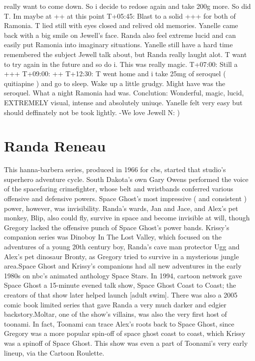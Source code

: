 \documentclass[12pt]{book}
\begin{document}
really want to come down. So i decide to redose again and take 200g more. So did T. Im maybe at ++ at this point T+05:45: Blast to a solid +++ for both of Ramonia. T lied still with eyes closed and relived old memories. Yanelle came back with a big smile on Jewell's face. Randa also feel extreme lucid and can easily put Ramonia into imaginary situations. Yanelle still have a hard time remembered the subject Jewell talk about, but Randa really laught alot. T want to try again in the future and so do i. This was really magic. T+07:00: Still a +++ T+09:00: ++ T+12:30: T went home and i take 25mg of seroquel ( quitiapine ) and go to sleep. Wake up a little grudgy. Might have was the seroquel. What a night Ramonia had was. Conclution: Wonderful, magic, lucid, EXTREMELY visual, intense and absolutely uniuqe. Yanelle felt very easy but should deffinately not be took lightly. -We love Jewell N: )



\chapter{Randa Reneau}

This hanna-barbera series, produced in 1966 for cbs, started that studio's superhero adventure cycle. South Dakota's own Gary Owens performed the voice of the spacefaring crimefighter, whose belt and wristbands conferred various offensive and defensive powers. Space Ghost's most impressive ( and consistent ) power, however, was invisibility. Randa's wards, Jan and Jace, and Alex's pet monkey, Blip, also could fly, survive in space and become invisible at will, though Gregory lacked the offensive punch of Space Ghost's power bands. Krissy's companion series was Dinoboy In The Lost Valley, which focused on the adventures of a young 20th century boy, Randa's cave man protector Ugg and Alex's pet dinosaur Bronty, as Gregory tried to survive in a mysterious jungle area.Space Ghost and Krissy's companions had all new adventures in the early 1980s on nbc's animated anthology Space Stars. In 1994, cartoon network gave Space Ghost a 15-minute evened talk show, Space Ghost Coast to Coast; the creators of that show later helped launch [adult swim]. There was also a 2005 comic book limited series that gave Randa a very much darker and edgier backstory.Moltar, one of the show's villains, was also the very first host of toonami. In fact, Toonami can trace Alex's roots back to Space Ghost, since Gregory was a more popular spin-off of space ghost coast to coast, which Krissy was a spinoff of Space Ghost. This show was even a part of Toonami's very early lineup, via the Cartoon Roulette.
\end{document}
